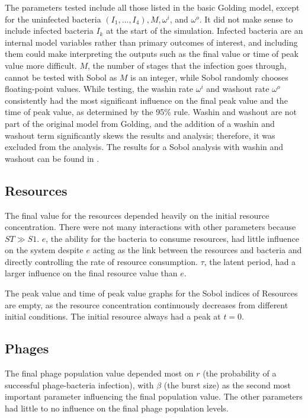 The parameters tested include all those listed in the basic Golding model, except for the uninfected bacteria $(I_1, \dots, I_4), M, \omega^i$, and $\omega^o$. 
It did not make sense to include infected bacteria $I_k$ at the start of the simulation. 
Infected bacteria are an internal model variables rather than primary outcomes of interest, and including them could make interpreting the outputs such as the final value or time of peak value more difficult. 
$M$, the number of stages that the infection goes through, cannot be tested with Sobol as $M$ is an integer, while Sobol randomly chooses floating-point values. 
While testing, the washin rate $\omega^i$ and washout rate $\omega^o$ consistently had the most significant influence on the final peak value and the time of peak value, as determined by the 95\% rule. 
Washin and washout are not part of the original model from Golding, and the addition of a washin and washout term significantly skews the results and analysis; therefore, it was excluded from the analysis. 
The results for a Sobol analysis with washin and washout can be found in . 

\subsection{Resources}
The final value for the resources depended heavily on the initial resource concentration. 
There were not many interactions with other parameters because $ST \gg S1$. 
$e$, the ability for the bacteria to consume resources, had little influence on the system despite $e$ acting as the link between the resources and bacteria and directly controlling the rate of resource consumption. 
$\tau$, the latent period, had a larger influence on the final resource value than $e$. 

The peak value and time of peak value graphs for the Sobol indices of Resources are empty, as the resource concentration continuously decreases from different initial conditions. 
The initial resource always had a peak at $t=0$. 

\subsection{Phages}
The final phage population value depended most on $r$ (the probability of a successful phage-bacteria infection), with $\beta$ (the burst size) as the second most important parameter influencing the final population value. 
The other parameters had little to no influence on the final phage population levels. 


